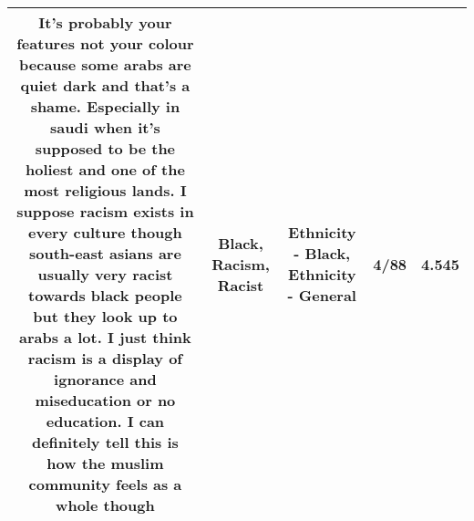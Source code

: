 \documentclass[11pt]{article}
\newlength\mylength
\begin{document}
\begin{center}
\begin{longtable}{|C{.65\mylength}|C{.30\mylength}|C{.12\mylength}|C{.12\mylength}|C{.12\mylength}|}
  \small It's probably your features not your colour because some arabs are quiet dark and that's a shame. Especially in saudi when it's supposed to be the holiest and one of the most religious lands. I suppose \textbf{racism} exists in every culture though south-east asians are usually very \textbf{racist} towards \textbf{black} people but they look up to arabs a lot. I just think \textbf{racism} is a display of ignorance and miseducation or no education. I can definitely tell this is how the muslim community feels as a whole though\normalsize   & Black, Racism, Racist & Ethnicity - Black, Ethnicity - General & 4/88 & 4.545 \\  \hline
  
\end{longtable}
\end{center}
\end{document}
